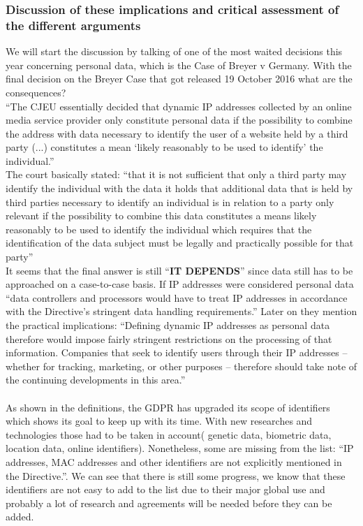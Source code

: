 \documentclass[9pt]{article}
\begin{document}
\subsubsection{Discussion of these implications and critical assessment of the different arguments}
We will start the discussion by talking of one of the most waited decisions this year concerning personal data, which is the Case of Breyer v Germany.
With the final decision on the Breyer Case that got released 19 October 2016 what are the consequences?\cite{IP:10}\\
\enquote{The CJEU essentially decided that dynamic IP addresses collected by an online media service provider only constitute personal data if the possibility to combine the address with data necessary to identify the user of a website held by a third party (...) constitutes a mean \enquote{likely reasonably to be used to identify} the individual.}\\
The court basically stated: \enquote{that it is not sufficient that only a third party may identify the individual with the data it holds that additional data that is held by third parties necessary to identify an individual is in relation to a party only relevant if the possibility to combine this data constitutes a means likely reasonably to be used to identify the individual which requires that the identification of the data subject must be legally and practically possible for that party}\cite{Breyer:2016}\\ It seems that the final answer is still \enquote{\textbf{IT DEPENDS}} since data still has to be approached on a case-to-case basis. If IP addresses were considered personal data \enquote{data controllers and processors would have to treat IP addresses in accordance with the Directive’s stringent data handling requirements.} Later on they mention the practical implications: \enquote{Defining dynamic IP addresses as personal data therefore would impose fairly stringent restrictions on the processing of that information.  Companies that seek to identify users through their IP addresses – whether for tracking, marketing, or other purposes – therefore should take note of the continuing developments in this area.} \cite{Proskauer}\\
\\
As shown in the definitions, the GDPR has upgraded its scope of identifiers which shows its goal to keep up with its time. With new researches and technologies those had to be taken in account( genetic data, biometric data, location data, online identifiers). Nonetheless, some are missing from the list: \enquote{IP addresses, MAC addresses and other identifiers are not explicitly mentioned in the Directive.}\cite{DPD-GDPR:1995-2018}. We can see that there is still some progress, we know that these identifiers are not easy to add to the list due to their major global use and probably a lot of research and agreements will be needed before they can be added.\\
\end{document}
